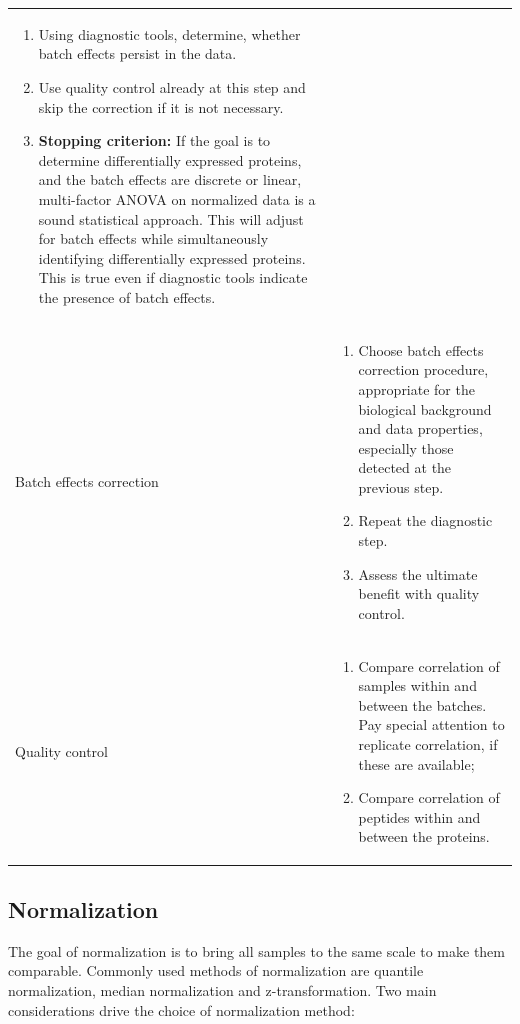 \documentclass[num-refs]{wiley-article}
\begin{document}
\begin{table}[hbt]
\begin{tcolorbox}
\begin{tabular}{>{\raggedright}p{2cm}m{10.5cm}}
\begin{enumerate}
				\item Using diagnostic tools, determine, whether batch effects persist in the data. 
				\item Use quality control already at this step and skip the correction if it is not necessary.
				\item \textbf{Stopping criterion:} If the goal is to determine differentially expressed proteins, and the batch effects are discrete or linear, multi-factor ANOVA on normalized data is a sound statistical approach. This will adjust for batch effects while simultaneously identifying differentially expressed proteins. This is true even if diagnostic tools indicate the presence of batch effects.
				
			\end{enumerate} \\ 
			Batch effects correction	& 	\begin{enumerate}
				\item	Choose batch effects correction procedure, appropriate for the biological background and data properties, especially those detected at the previous step.
			\item	Repeat the diagnostic step.
			\item	Assess the ultimate benefit with quality control.
\end{enumerate} \\ 

			Quality control 	& 	\begin{enumerate}
				
				\item	Compare correlation of samples within and between the batches. Pay special attention to replicate correlation, if these are available;
				\item	Compare correlation of peptides within and between the proteins.	
			\end{enumerate} \\ 
		\end{tabular}
		
	\end{tcolorbox}
\end{table}
\clearpage

\subsection{Normalization}

The goal of normalization is to bring all samples to the same scale to make them comparable. Commonly used methods of normalization are quantile normalization, median normalization and z-transformation. Two main considerations drive the choice of normalization method: 
\end{document}

